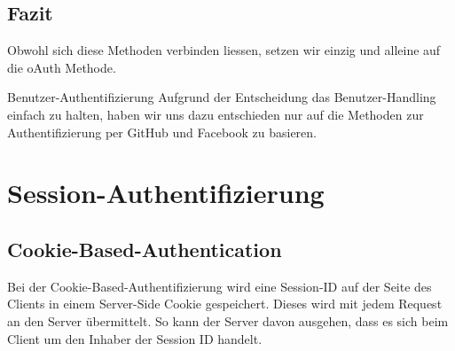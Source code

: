 \subsection{Fazit}
Obwohl sich diese Methoden verbinden liessen, setzen wir einzig und alleine auf die oAuth Methode.
\begin{decision}{Benutzer-Authentifizierung}
Aufgrund der Entscheidung das Benutzer-Handling einfach zu halten, haben wir uns dazu entschieden nur auf die Methoden zur Authentifizierung per GitHub und Facebook zu basieren.
\end{decision}

\section{Session-Authentifizierung}
\subsection{Cookie-Based-Authentication}
Bei der Cookie-Based-Authentifizierung wird eine Session-ID auf der Seite des Clients in einem Server-Side Cookie gespeichert. Dieses wird mit jedem Request an den Server übermittelt. So kann der Server davon ausgehen, dass es sich beim Client um den Inhaber der Session ID handelt.

